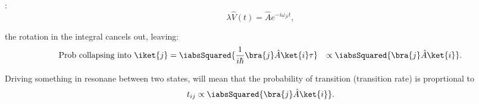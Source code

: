 :
\begin{equation}
  \lambda \hat{V}(t) = {\hat{A}}e^{-i\omega_{ji} t},
\end{equation}

\noindent the rotation in the integral cancels out, leaving:
\begin{equation}
  \begin{aligned}
    \text{Prob    collapsing     into    $     \iket{j}    $}     &    =
    \iabsSquared{\frac{1}{i\hbar}\bra{j}\hat{A}\ket{i}\tau}       &       \propto
    \iabsSquared{\bra{j}\hat{A}\ket{i}}.
  \end{aligned}
\end{equation}

\begin{framed}\noindent
  Driving something in  resonane between two states, will  mean that the
  probability of transition (transition rate) is proprtional to
  \begin{equation}
    t_{ij} \propto \iabsSquared{\bra{j}\hat{A}\ket{i}}.
  \end{equation}

\end{framed}
